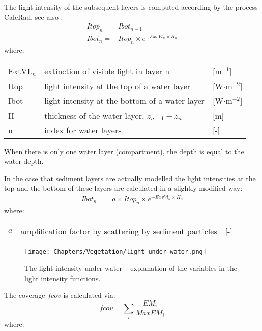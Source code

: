 The light intensity of the subsequent layers is computed according by the process CalcRad, see also
:
%
\begin{align}
Itop_n = &Ibot_{n-1} \\
Ibot_n = &Itop_n \times e^{-ExvVl_n \times H_n}
\end{align}
%
where:

\begin{tabular}{lll}
ExtVL$_n$  & extinction of visible light in layer n          & [m$^{-1}$]         \\
Itop       & light intensity at the top of a water layer     & [W$\cdot$m$^{-2}$] \\
Ibot       & light intensity at the bottom of a water layer  & [W$\cdot$m$^{-2}$] \\
H          & thickness of the water layer, $z_{n-1} - z_n$   & [m]                \\
n          & index for water layers                          & [-]                \\
\end{tabular}

When there is only one water layer (compartment), the depth is equal to the water depth.

In the case that sediment layers are actually modelled the light intensities at the top and the bottom of these
layers are calculated in a slightly modified way:
%
\begin{align}
Ibot_n = & a \times Itop_n \times e^{-ExvVl_n \times H_n}
\end{align}
%
where:

\begin{tabular}{lll}
$a$          & amplification factor by scattering by sediment particles & [-] \\
\end{tabular}

\begin{figure}
\centering
\texttt{[image: Chapters/Vegetation/light\_under\_water.png]}
\caption{The light intensity under water -- explanation of the variables in the light intensity functions.}
\label{fig:lightUnderWater}
\end{figure}

The coverage $fcov$ is calculated via:
%
\begin{equation}
fcov = \sum_i \frac{EM_i}{MaxEM_i}
\end{equation}
%
where:

